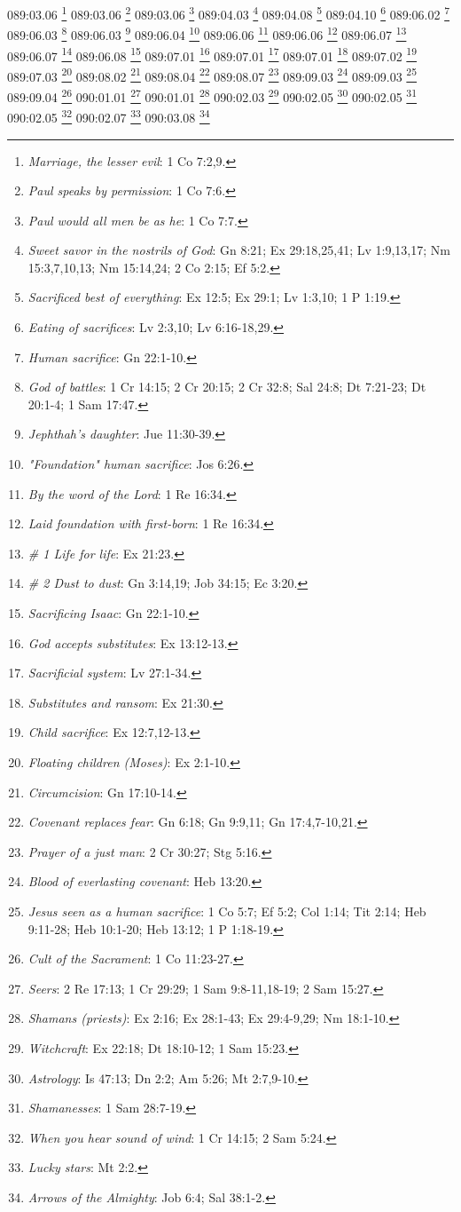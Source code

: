 089:03.06 \footnote{\textit{Marriage, the lesser evil}: 1 Co 7:2,9.}
089:03.06 \footnote{\textit{Paul speaks by permission}: 1 Co 7:6.}
089:03.06 \footnote{\textit{Paul would all men be as he}: 1 Co 7:7.}
089:04.03 \footnote{\textit{Sweet savor in the nostrils of God}: Gn 8:21; Ex 29:18,25,41; Lv 1:9,13,17; Nm 15:3,7,10,13; Nm 15:14,24; 2 Co 2:15; Ef 5:2.}
089:04.08 \footnote{\textit{Sacrificed best of everything}: Ex 12:5; Ex 29:1; Lv 1:3,10; 1 P 1:19.}
089:04.10 \footnote{\textit{Eating of sacrifices}: Lv 2:3,10; Lv 6:16-18,29.}
089:06.02 \footnote{\textit{Human sacrifice}: Gn 22:1-10.}
089:06.03 \footnote{\textit{God of battles}: 1 Cr 14:15; 2 Cr 20:15; 2 Cr 32:8; Sal 24:8; Dt 7:21-23; Dt 20:1-4; 1 Sam 17:47.}
089:06.03 \footnote{\textit{Jephthah's daughter}: Jue 11:30-39.}
089:06.04 \footnote{\textit{"Foundation" human sacrifice}: Jos 6:26.}
089:06.06 \footnote{\textit{By the word of the Lord}: 1 Re 16:34.}
089:06.06 \footnote{\textit{Laid foundation with first-born}: 1 Re 16:34.}
089:06.07 \footnote{\textit{# 1 Life for life}: Ex 21:23.}
089:06.07 \footnote{\textit{# 2 Dust to dust}: Gn 3:14,19; Job 34:15; Ec 3:20.}
089:06.08 \footnote{\textit{Sacrificing Isaac}: Gn 22:1-10.}
089:07.01 \footnote{\textit{God accepts substitutes}: Ex 13:12-13.}
089:07.01 \footnote{\textit{Sacrificial system}: Lv 27:1-34.}
089:07.01 \footnote{\textit{Substitutes and ransom}: Ex 21:30.}
089:07.02 \footnote{\textit{Child sacrifice}: Ex 12:7,12-13.}
089:07.03 \footnote{\textit{Floating children (Moses)}: Ex 2:1-10.}
089:08.02 \footnote{\textit{Circumcision}: Gn 17:10-14.}
089:08.04 \footnote{\textit{Covenant replaces fear}: Gn 6:18; Gn 9:9,11; Gn 17:4,7-10,21.}
089:08.07 \footnote{\textit{Prayer of a just man}: 2 Cr 30:27; Stg 5:16.}
089:09.03 \footnote{\textit{Blood of everlasting covenant}: Heb 13:20.}
089:09.03 \footnote{\textit{Jesus seen as a human sacrifice}: 1 Co 5:7; Ef 5:2; Col 1:14; Tit 2:14; Heb 9:11-28; Heb 10:1-20; Heb 13:12; 1 P 1:18-19.}
089:09.04 \footnote{\textit{Cult of the Sacrament}: 1 Co 11:23-27.}
090:01.01 \footnote{\textit{Seers}: 2 Re 17:13; 1 Cr 29:29; 1 Sam 9:8-11,18-19; 2 Sam 15:27.}
090:01.01 \footnote{\textit{Shamans (priests)}: Ex 2:16; Ex 28:1-43; Ex 29:4-9,29; Nm 18:1-10.}
090:02.03 \footnote{\textit{Witchcraft}: Ex 22:18; Dt 18:10-12; 1 Sam 15:23.}
090:02.05 \footnote{\textit{Astrology}: Is 47:13; Dn 2:2; Am 5:26; Mt 2:7,9-10.}
090:02.05 \footnote{\textit{Shamanesses}: 1 Sam 28:7-19.}
090:02.05 \footnote{\textit{When you hear sound of wind}: 1 Cr 14:15; 2 Sam 5:24.}
090:02.07 \footnote{\textit{Lucky stars}: Mt 2:2.}
090:03.08 \footnote{\textit{Arrows of the Almighty}: Job 6:4; Sal 38:1-2.}
